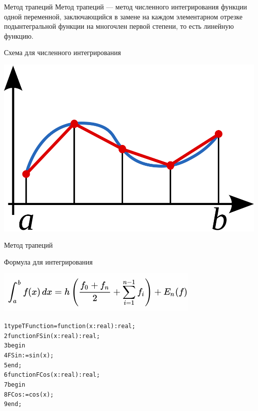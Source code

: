 \documentclass{beamer}
\begin{document}
\begin{frame}[fragile]
\begin{block}{Метод трапеций}
Метод трапеций — метод численного интегрирования функции одной переменной, заключающийся в замене на каждом элементарном отрезке подынтегральной функции на многочлен первой степени, то есть линейную функцию. 
\end{block}
\begin{block}{Схема для численного интегрирования}
\begin{center}
\includegraphics[scale=0.2]{images/trap.png}
\end{center}
\end{block}
\end{frame}

\begin{frame}[fragile]{Метод трапеций}
\begin{block}{Формула для интегрирования}
\begin{center}
\includegraphics[scale=0.5]{images/formula.png}
\end{center}
\end{block}
\begin{alltt}
 1 type TFunction = function(x:real):real;
 2 function FSin(x: real):real;
 3 begin
 4   FSin := sin(x);
 5 end;
 6 function FCos(x: real):real;
 7 begin
 8   FCos := cos(x);
 9 end;
\end{alltt}
\end{frame}
\end{document}
